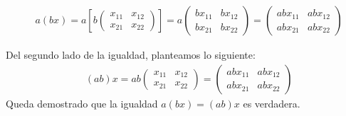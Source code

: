 \begin{exercise}[ Sea $a,b\in \R$ y $x=\begin{pmatrix}
				x_{11}&x_{12}\\x_{21}&x_{22}\end{pmatrix}$, $x\in M_{2\times 2}(\R)$]
	\begin{align*}
		 & a(bx)=a\left[b\begin{pmatrix}
				                 x_{11} & x_{12} \\x_{21}&x_{22}
			                 \end{pmatrix}\right]=a\begin{pmatrix}
			                                       bx_{11} & bx_{12} \\bx_{21}&bx_{22}
		                                       \end{pmatrix}=\begin{pmatrix}
			                                                     abx_{11} & abx_{12} \\abx_{21}&abx_{22}
		                                                     \end{pmatrix}
	\end{align*}

	Del segundo lado de la igualdad, planteamos lo siguiente:
	\begin{align*}
		 & (ab)x=ab\begin{pmatrix}
			           x_{11} & x_{12} \\x_{21}&x_{22}
		           \end{pmatrix}=\begin{pmatrix}
			                         abx_{11} & abx_{12} \\abx_{21}&abx_{22}
		                         \end{pmatrix}
	\end{align*}
	Queda demostrado que la igualdad $a(bx)=(ab)x$ es verdadera.
\end{exercise}


